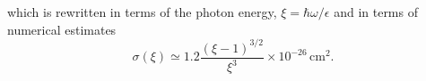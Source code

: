 which is rewritten in terms of the photon energy, $\xi = \hbar \omega/\epsilon$ and in terms of numerical estimates
\begin{equation}
    \sigma(\xi) \simeq  1.2\frac{(\xi-1)^{3/2}}{\xi^3}\times 10^{-26} \, \textrm{cm}^2.
\end{equation}




